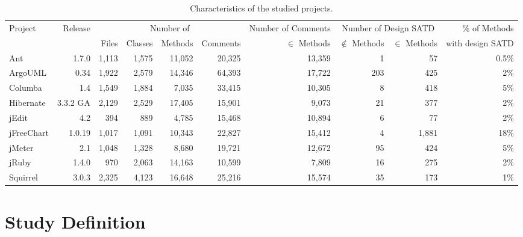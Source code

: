 \begin{landscape}
	\begin{table}[t]
		\caption{Characteristics of the studied projects.}
		\label{tab:projects}
		\centering
		\begin{adjustbox}{center}
			\begin{tabular}{l r | r r r r | r | r r | r}
				\hline
				\multirow{2}{*}{Project} & \multirow{2}{*}{Release} &\multicolumn{4}{c|}{Number of} &\multicolumn{1}{c|}{Number of Comments}
				&\multicolumn{2}{c|}{Number of Design SATD} & \% of Methods\\
				&& Files& Classes& Methods& Comments                      & $\in$ Methods& $\notin$ Methods & $\in$ Methods & with design SATD\\
				\hline
				Ant&1.7.0 & 1,113 & 1,575 & 11,052 & 20,325               & 13,359        &  1 & 57 & 0.5\% \\
				ArgoUML&0.34& 1,922 & 2,579 & 14,346 & 64,393       &  17,722       & 203 & 425  & 2\%\\
				Columba&1.4& 1,549 & 1,884 & 7,035 & 33,415           & 10,305        & 8 & 418 & 5\%  \\
				Hibernate&3.3.2 GA & 2,129 & 2,529 & 17,405 & 15,901 & 9,073        & 21  &  377  &  2\%\\
				jEdit & 4.2 & 394 & 889 & 4,785 & 15,468                     &10,894         & 6  & 77  & 2\% \\
				jFreeChart&1.0.19 & 1,017 & 1,091 & 10,343 & 22,827  & 15,412       &  4  & 1,881  & 18\%\\
				jMeter&2.1& 1,048 & 1,328 & 8,680 & 19,721                &  12,672      & 95 &  424 & 5\%  \\
				jRuby&1.4.0 & 970 & 2,063 & 14,163 & 10,599               & 7,809        & 16   & 275  &  2\%\\
				Squirrel&3.0.3 & 2,325 & 4,123 & 16,648 & 25,216         & 15,574      &35  & 173  & 1\%\\
				\hline
			\end{tabular}
		\end{adjustbox}
		\vspace{-4mm}
	\end{table}
\end{landscape}

\section{Study Definition}


